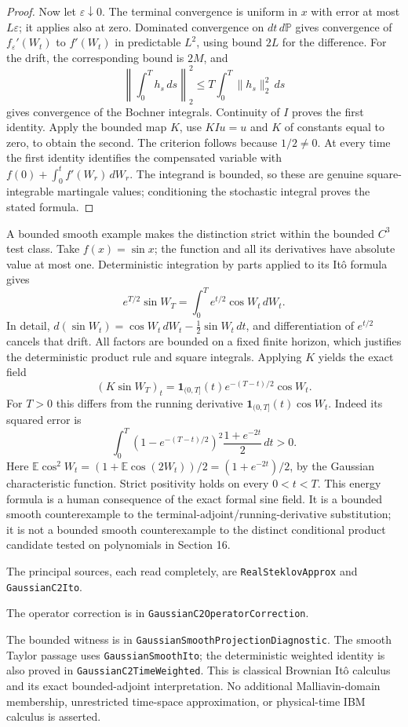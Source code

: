 \documentclass[11pt]{article}
\newcommand{\E}{\mathbb E}
\newcommand{\ind}{\mathbf1}
\newcommand{\code}[1]{{\small\nolinkurl{#1}}}
\begin{document}
\begin{proof}
Now let $\varepsilon\downarrow0$. The terminal convergence is
uniform in $x$ with error at most $L\varepsilon$; it applies also
at zero. Dominated convergence on $dt\,d\mathbb{P}$ gives convergence of
$f_\varepsilon'(W_t)$ to $f'(W_t)$ in predictable $L^2$,
using bound $2L$ for the difference. For the drift, the corresponding
bound is $2M$, and
\[
 \left\|\int_0^T h_s\,ds\right\|_2^2
 \leq T\int_0^T\|h_s\|_2^2\,ds
\]
gives convergence of the Bochner integrals.
Continuity of $I$ proves the first identity. Apply the bounded map
$K$, use $KIu=u$ and $K$ of constants equal to zero, to obtain the
second. The criterion follows because $1/2\ne0$.
At every time the first identity identifies the compensated variable
with $f(0)+\int_0^t f'(W_r)\,dW_r$. The integrand is bounded, so
these are genuine square-integrable martingale values; conditioning
the stochastic integral proves the stated formula.
\end{proof}

A bounded smooth example makes the distinction strict within the
bounded $C^3$ test class. Take $f(x)=\sin x$; the function and all
its derivatives have absolute value at most one. Deterministic
integration by parts applied to its It\^o formula gives
\[
 e^{T/2}\sin W_T=\int_0^T e^{t/2}\cos W_t\,dW_t.
\]
In detail, $d(\sin W_t)=\cos W_t\,dW_t-
\tfrac12\sin W_t\,dt$, and differentiation of $e^{t/2}$ cancels
that drift. All factors are bounded on a fixed finite horizon,
which justifies the deterministic product rule and square integrals.
Applying $K$ yields the exact field
\[
 (K\sin W_T)_t=\ind_{(0,T]}(t)e^{-(T-t)/2}\cos W_t.
\]
For $T>0$ this differs from the running derivative
$\ind_{(0,T]}(t)\cos W_t$. Indeed its squared error is
\[
 \int_0^T(1-e^{-(T-t)/2})^2\frac{1+e^{-2t}}2\,dt>0.
\]
Here $\E\cos^2W_t=(1+\E\cos(2W_t))/2=(1+e^{-2t})/2$,
by the Gaussian characteristic function. Strict positivity holds
on every $0<t<T$. This energy formula is a human consequence of
the exact formal sine field. It is a bounded smooth counterexample
to the terminal-adjoint/running-derivative substitution; it is not
a bounded smooth counterexample to the distinct conditional product
candidate tested on polynomials in Section 16.

\par\noindent
The principal sources, each read completely, are
\code{RealSteklovApprox} and \code{GaussianC2Ito}.

\noindent The operator correction is in \code{GaussianC2OperatorCorrection}.

\noindent The bounded witness is in \code{GaussianSmoothProjectionDiagnostic}.
The smooth Taylor passage uses \code{GaussianSmoothIto}; the
deterministic weighted identity is also proved in
\code{GaussianC2TimeWeighted}. This is classical Brownian It\^o
calculus and its exact bounded-adjoint interpretation. No additional
Malliavin-domain membership, unrestricted time-space approximation,
or physical-time IBM calculus is asserted.
\end{document}
